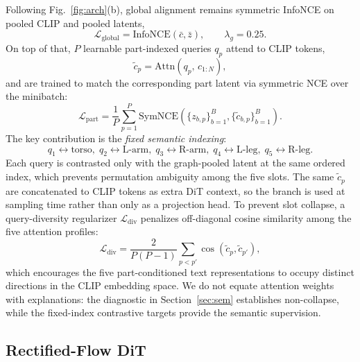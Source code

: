 \documentclass[journal]{IEEEtran}
\begin{document}
Following Fig.~\ref{fig:arch}(b), global alignment remains symmetric InfoNCE on pooled CLIP and pooled latents,
\begin{equation}
\mathcal{L}_{\mathrm{global}}=\mathrm{InfoNCE}(\bar c,\bar z),\qquad \lambda_g=0.25.
\end{equation}
On top of that, $P$ learnable part-indexed queries $q_p$ attend to CLIP tokens,
\begin{equation}
\tilde c_p=\mathrm{Attn}(q_p,\,c_{1:N}),
\end{equation}
and are trained to match the corresponding part latent via symmetric NCE over the minibatch:
\begin{equation}
\mathcal{L}_{\mathrm{part}}=\frac{1}{P}\sum_{p=1}^{P}\mathrm{SymNCE}\!\left(\{z_{b,p}\}_{b=1}^{B},\{\tilde c_{b,p}\}_{b=1}^{B}\right).
\end{equation}
The key contribution is the \emph{fixed semantic indexing}:
\begin{equation}
q_1\!\leftrightarrow\!\text{torso},\;q_2\!\leftrightarrow\!\text{L-arm},\;q_3\!\leftrightarrow\!\text{R-arm},\;q_4\!\leftrightarrow\!\text{L-leg},\;q_5\!\leftrightarrow\!\text{R-leg}.
\end{equation}
Each query is contrasted only with the graph-pooled latent at the same ordered index, which prevents permutation ambiguity among the five slots. The same $\tilde c_p$ are concatenated to CLIP tokens as extra DiT context, so the branch is used at sampling time rather than only as a projection head. To prevent slot collapse, a query-diversity regularizer $\mathcal{L}_{\mathrm{div}}$ penalizes off-diagonal cosine similarity among the five attention profiles:
\begin{equation}
\mathcal{L}_{\mathrm{div}}=\frac{2}{P(P-1)}\sum_{p<p'}\cos(\tilde c_p,\tilde c_{p'}),
\end{equation}
which encourages the five part-conditioned text representations to occupy distinct directions in the CLIP embedding space. We do not equate attention weights with explanations: the diagnostic in Section~\ref{sec:sem} establishes non-collapse, while the fixed-index contrastive targets provide the semantic supervision.

\subsection{Rectified-Flow DiT}
\label{sec:method-flow}
\end{document}
